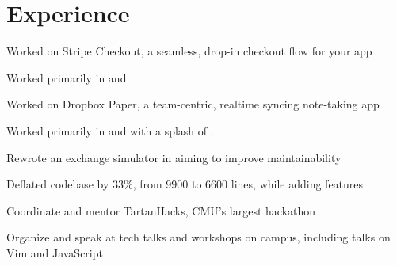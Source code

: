 \documentclass[]{deedy-resume-openfont}
\begin{document}
\hfill
\begin{minipage}[t]{0.66\textwidth}


\section{Experience}

\vspace{\topsep} %
\begin{tightemize}
\item Worked on Stripe Checkout, a seamless, drop-in checkout flow for your app
\item Worked primarily in  and 
\end{tightemize}
\sectionsep

\begin{tightemize}
\item Worked on Dropbox Paper, a team-centric, realtime syncing note-taking app
\item Worked primarily in  and  with a
  splash of .
\end{tightemize}
\sectionsep

\begin{tightemize}
\item Rewrote an exchange simulator in  aiming to improve
  maintainability
\item Deflated codebase by 33\%, from 9900 to 6600 lines, while adding features
\end{tightemize}
\sectionsep

\begin{tightemize}
\item Coordinate and mentor TartanHacks, CMU's largest hackathon
\item Organize and speak at tech talks and workshops on campus, including talks
  on Vim and JavaScript
\end{tightemize}
\sectionsep


\end{minipage}
\end{document}

